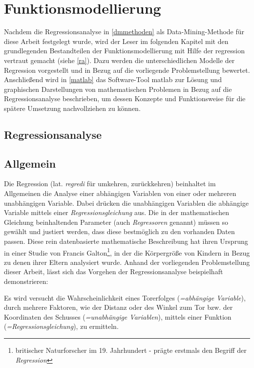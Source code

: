 \section{Funktionsmodellierung}
\label{fm}
Nachdem die Regressionsanalyse in \vref{dmmethoden} als Data-Mining-Methode für diese Arbeit festgelegt wurde, wird der Leser im folgenden Kapitel mit den grundlegenden Bestandteilen der Funktionsmodellierung mit Hilfe der \gls{regression} vertraut gemacht (siehe \vref{ra}). Dazu werden die unterschiedlichen Modelle der Regression vorgestellt und in Bezug auf die vorliegende Problemstellung bewertet. Anschließend wird in \vref{matlab} das Software-Tool \gls{matlab} zur Lösung und graphischen Darstellungen von mathematischen Problemen in Bezug auf die Regressionsanalyse beschrieben, um dessen Konzepte und Funktionsweise für die spätere Umsetzung nachvollziehen zu können.


\subsection{Regressionsanalyse}
\label{ra}
\subsection{Allgemein}
Die Regression (lat. \textit{regredi} für umkehren, zurückkehren) beinhaltet im Allgemeinen die Analyse einer abhängigen Variablen von einer oder mehreren unabhängigen Variable. Dabei drücken die unabhängigen Variablen die abhängige Variable mittels einer \textit{Regressionsgleichung} aus. Die in der mathematischen Gleichung beinhaltenden Parameter (auch \textit{Regressoren} genannt) müssen so gewählt und justiert werden, dass diese bestmöglich zu den vorhanden Daten passen. Diese rein datenbasierte mathematische Beschreibung hat ihren Ursprung in einer Studie von Francis Galton\footnote{britischer Naturforscher im 19. Jahrhundert - prägte erstmals den Begriff der \textit{Regression}}, in der die Körpergröße von Kindern in Bezug zu denen ihrer Eltern analysiert wurde. Anhand der vorliegenden Problemstellung dieser Arbeit, lässt sich das Vorgehen der Regressionsanalyse beispielhaft demonstrieren:

Es wird versucht die Wahrscheinlichkeit eines Torerfolges (\textit{=abhängige Variable}), durch mehrere Faktoren, wie der Distanz oder des Winkel zum Tor bzw. der Koordinaten des Schusses (\textit{=unabhängige Variablen}), mittels einer Funktion (\textit{=Regressionsgleichung}), zu ermitteln. 

